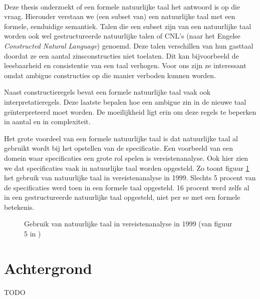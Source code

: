 \documentclass[]{article}
\theoremstyle{definition}
\begin{document}
\paragraph{} Deze thesis onderzoekt of een formele natuurlijke taal het antwoord is op die vraag. Hieronder verstaan we (een subset van) een natuurlijke taal met een formele, eenduidige semantiek. Talen die een subset zijn van een natuurlijke taal worden ook wel gestructureerde natuurlijke talen of CNL's (naar het Engelse \textit{Constructed Natural Language}) genoemd. Deze talen verschillen van hun gasttaal doordat ze een aantal zinsconstructies niet toelaten. Dit kan bijvoorbeeld de leesbaarheid en consistentie van een taal verhogen. Voor ons zijn ze interessant omdat ambigue constructies op die manier verboden kunnen worden.

Naast constructieregels bevat een formele natuurlijke taal vaak ook interpretatieregels. Deze laatste bepalen hoe een ambigue zin in de nieuwe taal geïnterpreteerd moet worden. De moeilijkheid ligt erin om deze regels te beperken in aantal en in complexiteit.

Het grote voordeel van een formele natuurlijke taal is dat natuurlijke taal al gebruikt wordt bij het opstellen van de specificatie. Een voorbeeld van een domein waar specificaties een grote rol spelen is vereistenanalyse. Ook hier zien we dat specificaties vaak in natuurlijke taal worden opgesteld. Zo toont figuur \ref{fig:natural-language-use} het gebruik van natuurlijke taal in vereistenanalyse in 1999. Slechts 5 procent van de specificaties werd toen in een formele taal opgesteld. 16 procent werd zelfs al in een gestructureerde natuurlijke taal opgesteld, niet per se met een formele betekenis.

\begin{figure}
  \label{fig:natural-language-use}
  \caption{Gebruik van natuurlijke taal in vereistenanalyse in 1999 (van figuur 5 in \cite{Luisa2004})}
\end{figure}

\section{Achtergrond}
TODO
\end{document}
